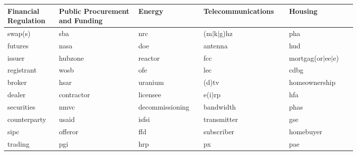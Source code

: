 \renewcommand{\arraystretch}{1.1}
\small
\centering

\begin{tabular}{p{0.125\linewidth}p{0.2\linewidth}p{0.15\linewidth}p{0.175\linewidth}p{0.175\linewidth}}
    \toprule
    \bfseries Financial Regulation&\bfseries Public Procurement and Funding&\bfseries Energy&\bfseries Telecommunications&\bfseries Housing\\
    \midrule
    swap(s)         &sba        &nrc                &(m$|$k$|$g)hz  &pha\\
    futures         &nasa       &doe                &antenna        &hud\\
    issuer          &hubzone    &reactor            &fcc            &mortgag(or$|$ee$|$e)\\
    registrant      &wosb       &ofe                &lec            &cdbg\\
    broker          &hsar       &uranium            &(d)tv          &homeownership\\
    dealer          &contractor &licensee           &e(i)rp         &hfa\\
    securities      &nmvc       &decommissioning    &bandwidth      &phas\\
    counterparty    &usaid      &isfsi              &transmitter    &gse\\
    sipc            &offeror    &ffd                &subscriber     &homebuyer\\
    trading         &pgi        &hrp                &px             &pae\\
    \bottomrule
\end{tabular}
\vspace*{18pt}

